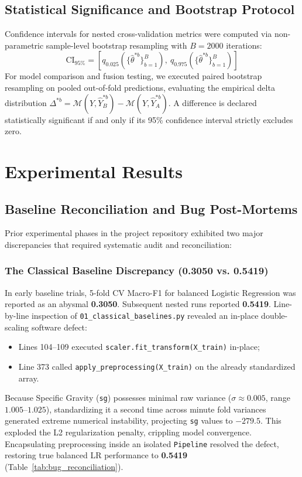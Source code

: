 \documentclass[conference]{IEEEtran}
\begin{document}
\subsection{Statistical Significance and Bootstrap Protocol}
Confidence intervals for nested cross-validation metrics were computed via non-parametric sample-level bootstrap resampling with $B = 2000$ iterations:
\begin{equation}
\text{CI}_{95\%} = \left[ q_{0.025}\left(\{\hat{\theta}^{*b}\}_{b=1}^B\right), \ q_{0.975}\left(\{\hat{\theta}^{*b}\}_{b=1}^B\right) \right]
\end{equation}
For model comparison and fusion testing, we executed paired bootstrap resampling on pooled out-of-fold predictions, evaluating the empirical delta distribution $\Delta^{*b} = \mathcal{M}(Y, \hat{Y}_B^{*b}) - \mathcal{M}(Y, \hat{Y}_A^{*b})$. A difference is declared statistically significant if and only if its 95\% confidence interval strictly excludes zero.

\section{Experimental Results}

\subsection{Baseline Reconciliation and Bug Post-Mortems}
Prior experimental phases in the project repository exhibited two major discrepancies that required systematic audit and reconciliation:

\subsubsection{The Classical Baseline Discrepancy (0.3050 vs. 0.5419)}
In early baseline trials, 5-fold CV Macro-F1 for balanced Logistic Regression was reported as an abysmal \textbf{0.3050}. Subsequent nested runs reported \textbf{0.5419}. Line-by-line inspection of \texttt{01\_classical\_baselines.py} revealed an in-place double-scaling software defect:
\begin{itemize}
    \item Lines 104--109 executed \texttt{scaler.fit\_transform(X\_train)} in-place;
    \item Line 373 called \texttt{apply\_preprocessing(X\_train)} on the already standardized array.
\end{itemize}
Because Specific Gravity (\texttt{sg}) possesses minimal raw variance ($\sigma \approx 0.005$, range $1.005$--$1.025$), standardizing it a second time across minute fold variances generated extreme numerical instability, projecting \texttt{sg} values to \textbf{$-279.5$}. This exploded the L2 regularization penalty, crippling model convergence. Encapsulating preprocessing inside an isolated \texttt{Pipeline} resolved the defect, restoring true balanced LR performance to \textbf{0.5419} (Table~\ref{tab:bug_reconciliation}).
\end{document}
